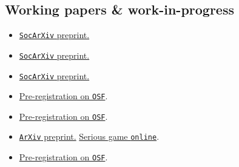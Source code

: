 \subsection{Working papers \& work-in-progress}
\begin{itemize}[leftmargin=2.75cm,itemsep=2pt]
\item { \href{https://www.doi.org/10.31235/osf.io/kr64j_v1}{\texttt{SocArXiv} preprint.}}
\item { \href{https://doi.org/10.31235/osf.io/x5u6b_v1}{\texttt{SocArXiv} preprint.}}
\item { \href{https://doi.org/10.31235/osf.io/bmcjy_v1}{\texttt{SocArXiv} preprint.}} %
\item {\href{https://osf.io/x5rnu/?view_only=7a280a04e9e947588a5f8d938e0a549b}{Pre-registration on \texttt{OSF}}.}
\item { \href{https://osf.io/h2stv/?view_only=db9bcdb538bb4a028d96aec6c6821ab6}{Pre-registration on \texttt{OSF}}.}



\item {
\href{https://doi.org/10.48550/arXiv.2508.12799}{\texttt{ArXiv} preprint.} \href{https://sweet-sure.ch/game/}{Serious game \texttt{online}}.}
\item { \href{https://osf.io/5atwq/?view_only=d5afa28f9a214b48af3ec1d514dbc7d4}{Pre-registration on \texttt{OSF}}.}

\end{itemize}

